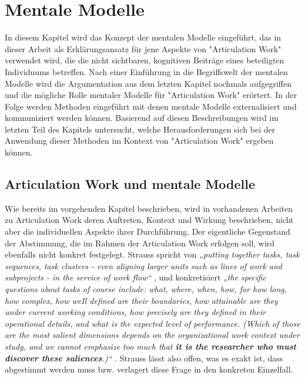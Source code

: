 
\chapter{Mentale Modelle} %
\label{cha:mentale_modelle}

In diesem Kapitel wird das Konzept der mentalen Modelle eingeführt, das in dieser Arbeit als Erklärungsansatz für jene Aspekte von "Articulation Work" verwendet wird, die die nicht sichtbaren, kognitiven Beiträge eines beteiligten Individuums betreffen. Nach einer Einführung in die Begriffswelt der mentalen Modelle wird die Argumentation aus dem letzten Kapitel nochmals aufgegriffen und die mögliche Rolle mentaler Modelle für "Articulation Work" erörtert. In der Folge werden Methoden eingeführt mit denen mentale Modelle externalisiert und kommuniziert werden können. Basierend auf diesen Beschreibungen wird im letzten Teil des Kapitels untersucht, welche Herausforderungen sich bei der Anwendung dieser Methoden im Kontext von "Articulation Work" ergeben können.

\section{Articulation Work und mentale Modelle} %
\label{sec:articulation_work_und_mentale_modelle}

Wie bereits im vorgehenden Kapitel beschrieben, wird in vorhandenen Arbeiten zu Articulation Work deren Auftreten, Kontext und Wirkung beschrieben, nicht aber die individuellen Aspekte ihrer Durchführung. Der eigentliche Gegenstand der Abstimmung, die im Rahmen der Articulation Work erfolgen soll, wird ebenfalls nicht konkret festgelegt. Strauss spricht von \emph{„putting together tasks, task sequences, task clusters - even aligning larger units such as lines of work and subprojects - in the service of work flow“} \citep[][S. 2]{Strauss88}, und konkretisiert \emph{„the specific questions about tasks of course include: what, where, when, how, for how long, how complex, how weIl defined are their boundaries, how attainable are they under current working conditions, how precisely are they defined in their operational details, and what is the expected level of performance. (Which of those are the most salient dimensions depends on the organizational work context under study, and we cannot emphasize too much that \textbf{it is the researcher who must discover these saliences}.)“} \citep[][S. 6]{Strauss85}. Strauss lässt also offen, was es exakt ist, dass abgestimmt werden muss bzw. verlagert diese Frage in den konkreten Einzelfall. 

